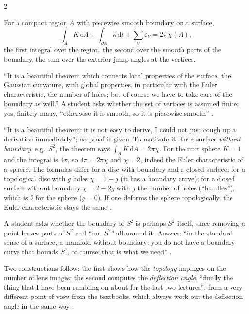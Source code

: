\begin{paracol}{2}
\begin{theorem}\label{thm:c17-gb}
For a compact region $A$ with piecewise smooth boundary on a surface,
\[
  \int_AK\,\mathrm dA+\int_{\partial A}\kappa\,\mathrm dt+\sum_{V}\varepsilon_V=2\pi\,\chi(A),
\]
the first integral over the region, the second over the smooth parts of the boundary, the sum over the exterior jump angles at the vertices.
\end{theorem}
``It is a beautiful theorem which connects local properties of the surface, the Gaussian curvature, with global properties, in particular with the Euler characteristic, the number of holes; but of course we have to take care of the boundary as well.'' A student asks whether the set of vertices is assumed finite: yes, finitely many, ``otherwise it is smooth, so it is piecewise smooth'' .
\begin{coursenote}
``It is a beautiful theorem; it is not easy to derive, I could not just cough up a derivation immediately''; no proof is given. To motivate it: for a surface \emph{without boundary}, e.g.\ $S^2$, the theorem says $\int_AK\,\mathrm dA=2\pi\chi$. For the unit sphere $K=1$ and the integral is $4\pi$, so $4\pi=2\pi\chi$ and $\chi=2$, indeed the Euler characteristic of a sphere. The formulas differ for a disc with boundary and a closed surface: for a topological disc with $g$ holes $\chi=1-g$ (it has a boundary curve); for a closed surface without boundary $\chi=2-2g$ with $g$ the number of holes (``handles''), which is $2$ for the sphere ($g=0$). If one deforms the sphere topologically, the Euler characteristic stays the same .
\end{coursenote}
\begin{coursenote}
A student asks whether the boundary of $S^2$ is perhaps $S^2$ itself, since removing a point leaves parts of $S^2$ and ``not $S^2$'' all around it. Answer: ``in the standard sense of a surface, a manifold without boundary: you do not have a boundary curve that bounds $S^2$, of course; that is what we need'' .
\end{coursenote}

Two constructions follow: the first shows how the \emph{topology} impinges on the number of lens images; the second computes the \emph{deflection angle}, ``finally the thing that I have been rambling on about for the last two lectures'', from a very different point of view from the textbooks, which always work out the deflection angle in the same way .


\end{paracol}
